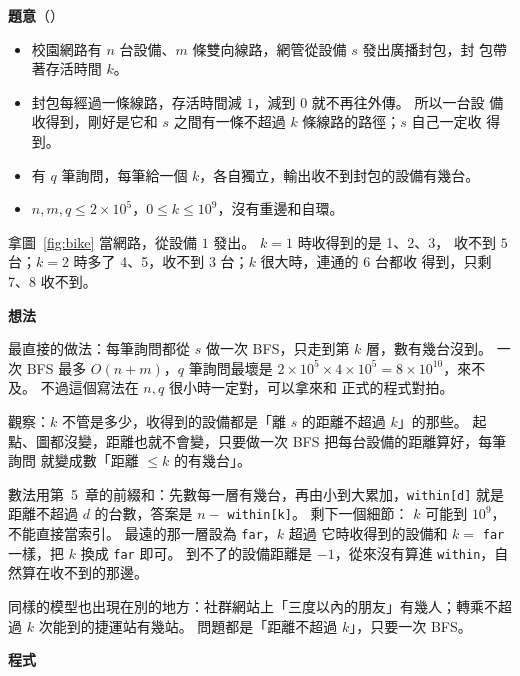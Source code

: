 \textbf{題意}（）

\begin{itemize}
\item 校園網路有 $n$ 台設備、$m$ 條雙向線路，網管從設備 $s$ 發出廣播封包，封
包帶著存活時間 $k$。
\item 封包每經過一條線路，存活時間減 $1$，減到 $0$ 就不再往外傳。 所以一台設
備收得到，剛好是它和 $s$ 之間有一條不超過 $k$ 條線路的路徑；$s$ 自己一定收
得到。
\item 有 $q$ 筆詢問，每筆給一個 $k$，各自獨立，輸出收不到封包的設備有幾台。
\item $n, m, q \le 2 \times 10^5$，$0 \le k \le 10^9$，沒有重邊和自環。
\end{itemize}

拿圖~\ref{fig:bike} 當網路，從設備 $1$ 發出。 $k = 1$ 時收得到的是 1、2、3，
收不到 $5$ 台；$k = 2$ 時多了 4、5，收不到 $3$ 台；$k$ 很大時，連通的 6 台都收
得到，只剩 7、8 收不到。

\textbf{想法}

最直接的做法：每筆詢問都從 $s$ 做一次 BFS，只走到第 $k$ 層，數有幾台沒到。
一次 BFS 最多 $O(n + m)$，$q$ 筆詢問最壞是 $2 \times 10^5 \times 4 \times 10^5
= 8 \times 10^{10}$，來不及。 不過這個寫法在 $n, q$ 很小時一定對，可以拿來和
正式的程式對拍。

觀察：$k$ 不管是多少，收得到的設備都是「離 $s$ 的距離不超過 $k$」的那些。 起
點、圖都沒變，距離也就不會變，只要做一次 BFS 把每台設備的距離算好，每筆詢問
就變成數「距離 $\le k$ 的有幾台」。

數法用第~5~章的前綴和：先數每一層有幾台，再由小到大累加，\texttt{within[d]}
就是距離不超過 $d$ 的台數，答案是 $n - $ \texttt{within[k]}。 剩下一個細節：
$k$ 可能到 $10^9$，不能直接當索引。 最遠的那一層設為 \texttt{far}，$k$ 超過
它時收得到的設備和 $k = $ \texttt{far} 一樣，把 $k$ 換成 \texttt{far} 即可。
到不了的設備距離是 $-1$，從來沒有算進 \texttt{within}，自然算在收不到的那邊。

同樣的模型也出現在別的地方：社群網站上「三度以內的朋友」有幾人；轉乘不超過
$k$ 次能到的捷運站有幾站。 問題都是「距離不超過 $k$」，只要一次 BFS。

\textbf{程式}

